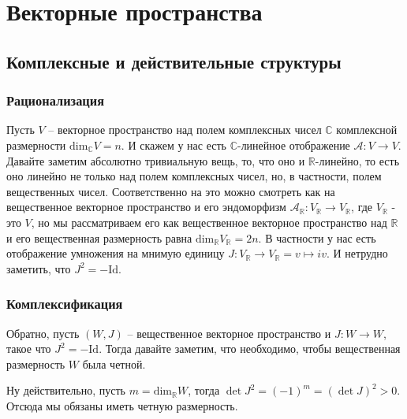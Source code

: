 \documentclass[a4paper, 12pt, oneside]{book}
\begin{document}
\chapter{Векторные пространства}
\section{Комплексные и действительные структуры}
\subsection{Рационализация}
Пусть $V$ – векторное пространство над полем комплексных чисел $\mathbb C$
комплексной размерности $\text{dim}_{\mathbb C} V=n$. И
скажем у нас есть $\mathbb C$-линейное отображение $\mathcal A:V\rightarrow V$.
Давайте заметим абсолютно тривиальную вещь, то, что оно и $\mathbb R$-линейно,
то есть оно линейно не только над полем комплексных чисел, но, в частности,
полем вещественных чисел. Соответственно на это можно смотреть как на
вещественное векторное пространство и его эндоморфизм $\mathcal A_{\mathbb R}:
V_{\mathbb R}\rightarrow V_{\mathbb R}$, где $V_{\mathbb R}$ - это $V$, но мы
рассматриваем его как вещественное векторное пространство над $\mathbb R$ и
его вещественная размерность равна $\text{dim}_{\mathbb R} V_{\mathbb R} = 2n$. В
частности у нас есть отображение умножения на мнимую единицу $J:V_{\mathbb R}
\rightarrow V_{\mathbb R}=v\mapsto iv$. И нетрудно заметить, что $J^2=-\text{Id}$.

\subsection{Комплексификация}
Обратно, пусть $(W,J)$ – вещественное векторное пространство и $J:W\rightarrow
W$, такое что $J^2=-\text{Id}$. Тогда давайте заметим, что необходимо, чтобы 
вещественная размерность $W$ была четной.

Ну действительно, пусть $m=\text{dim}_{\mathbb R} W$, тогда $\det J^2=(-1)^m=
(\det J)^2>0$. Отсюда мы обязаны иметь четную размерность.
\end{document}
